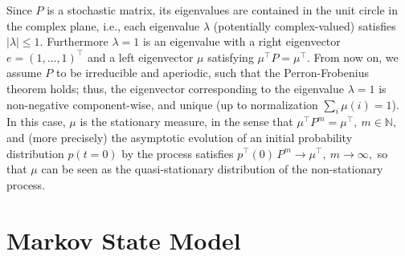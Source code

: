 \documentclass[journal=jctcce,manuscript=article]{achemso}
\newcommand{\vect}[1]{#1}
\newcommand{\mymu}{\mu}
\begin{document}
Since $P$ is a stochastic matrix, its eigenvalues are contained in the unit circle in
the complex plane, i.e., each eigenvalue $\lambda$ (potentially complex-valued)
satisfies $|\lambda|\le 1$. Furthermore $\lambda=1$ is an
eigenvalue with a right eigenvector $\vect e=(1,\ldots,1)^{\top}$ and a left eigenvector $\mymu$
satisfying
$\mymu^{\top}P=\mymu^{\top}$.
From now on, we assume $P$ to be irreducible and aperiodic, such that the Perron-Frobenius theorem holds; thus, the eigenvector corresponding to the eigenvalue $\lambda=1$ is  non-negative component-wise, and unique (up to normalization $\sum_i\mu(i)=1$). In this case, $\mymu$ is the stationary measure, in the sense that
$
 \mymu^{\top} P^m = \mymu^{\top},\ m\in\mathbb N
$,
and (more precisely) the asymptotic evolution of an initial probability distribution $\vect p(t=0)$ by the process satisfies
$
\vect p^{\top}(0)\,P^m \to \mymu^{\top},\ m\to\infty,
$
so that $\mymu$ can be seen as the quasi-stationary distribution of the non-stationary process.



\section{Markov State Model}
\label{sec:build-msm}
\end{document}
